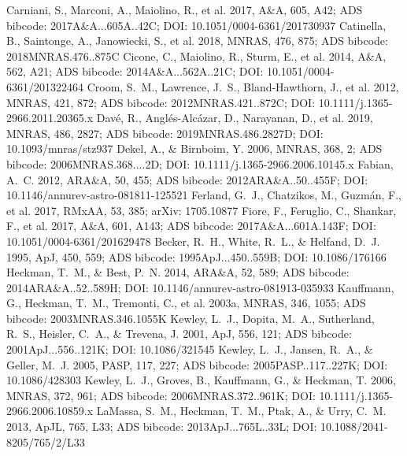 \documentclass[twocolumn]{aastex631}
\begin{document}
\begin{thebibliography}{}
 Carniani, S., Marconi, A., Maiolino, R., et al. 2017, A\&A, 605, A42; ADS bibcode: 2017A\&A...605A..42C; DOI: 10.1051/0004-6361/201730937
 Catinella, B., Saintonge, A., Janowiecki, S., et al. 2018, MNRAS, 476, 875; ADS bibcode: 2018MNRAS.476..875C
 Cicone, C., Maiolino, R., Sturm, E., et al. 2014, A\&A, 562, A21; ADS bibcode: 2014A\&A...562A..21C; DOI: 10.1051/0004-6361/201322464
 Croom, S.~M., Lawrence, J.~S., Bland-Hawthorn, J., et al. 2012, MNRAS, 421, 872; ADS bibcode: 2012MNRAS.421..872C; DOI: 10.1111/j.1365-2966.2011.20365.x
 Dav{\'e}, R., Angl{\'e}s-Alc{\'a}zar, D., Narayanan, D., et al. 2019, MNRAS, 486, 2827; ADS bibcode: 2019MNRAS.486.2827D; DOI: 10.1093/mnras/stz937
 Dekel, A., \& Birnboim, Y. 2006, MNRAS, 368, 2; ADS bibcode: 2006MNRAS.368....2D; DOI: 10.1111/j.1365-2966.2006.10145.x
 Fabian, A.~C. 2012, ARA\&A, 50, 455; ADS bibcode: 2012ARA\&A..50..455F; DOI: 10.1146/annurev-astro-081811-125521
 Ferland, G.~J., Chatzikos, M., Guzm\'an, F., et al. 2017, RMxAA, 53, 385; arXiv: 1705.10877
 Fiore, F., Feruglio, C., Shankar, F., et al. 2017, A\&A, 601, A143; ADS bibcode: 2017A\&A...601A.143F; DOI: 10.1051/0004-6361/201629478
 Becker, R.~H., White, R.~L., \& Helfand, D.~J. 1995, ApJ, 450, 559; ADS bibcode: 1995ApJ...450..559B; DOI: 10.1086/176166
 Heckman, T.~M., \& Best, P.~N. 2014, ARA\&A, 52, 589; ADS bibcode: 2014ARA\&A..52..589H; DOI: 10.1146/annurev-astro-081913-035933
 Kauffmann, G., Heckman, T.~M., Tremonti, C., et al. 2003a, MNRAS, 346, 1055; ADS bibcode: 2003MNRAS.346.1055K
 Kewley, L.~J., Dopita, M.~A., Sutherland, R.~S., Heisler, C.~A., \& Trevena, J. 2001, ApJ, 556, 121; ADS bibcode: 2001ApJ...556..121K; DOI: 10.1086/321545
 Kewley, L.~J., Jansen, R.~A., \& Geller, M.~J. 2005, PASP, 117, 227; ADS bibcode: 2005PASP..117..227K; DOI: 10.1086/428303
 Kewley, L.~J., Groves, B., Kauffmann, G., \& Heckman, T. 2006, MNRAS, 372, 961; ADS bibcode: 2006MNRAS.372..961K; DOI: 10.1111/j.1365-2966.2006.10859.x
 LaMassa, S.~M., Heckman, T.~M., Ptak, A., \& Urry, C.~M. 2013, ApJL, 765, L33; ADS bibcode: 2013ApJ...765L..33L; DOI: 10.1088/2041-8205/765/2/L33

\end{thebibliography}
\end{document}

